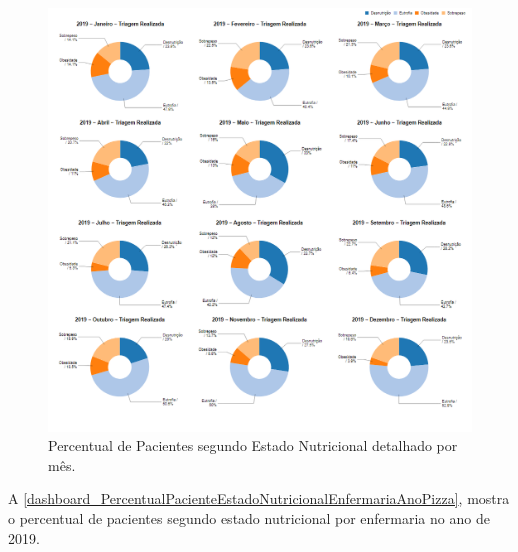 \begin{figure}[htb]
	\caption{\label{dashboard_PercentualPacienteEstadoNutricionalHospitalMesLinha}Percentual de Pacientes segundo Estado Nutricional detalhado por mês.}
	\begin{center}
	    \includegraphics[scale=0.6]{Imagens/3.2.PercentualPacienteEstadoNutricionalHospitalMesLinha.png}
	\end{center}
\end{figure}

\newpage
A \autoref{dashboard_PercentualPacienteEstadoNutricionalEnfermariaAnoPizza}, mostra o percentual de pacientes segundo estado nutricional por enfermaria no ano de 2019.

